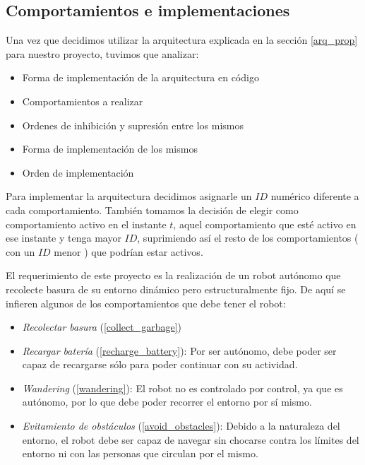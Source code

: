 
\subsection{Comportamientos e implementaciones}
\label{comportamientos}

Una vez que decidimos utilizar la arquitectura explicada en la secci\'on \ref{arq_prop}
para nuestro proyecto, tuvimos que analizar:
\begin{itemize}
\item{}Forma de implementaci\'on de la arquitectura en c\'odigo
\item{}Comportamientos a realizar
\item{}Ordenes de inhibici\'on y supresi\'on entre los mismos
\item{}Forma de implementaci\'on de los mismos
\item{}Orden de implementaci\'on
\end{itemize}

Para implementar la arquitectura decidimos asignarle un $ID$ num\'erico diferente a cada comportamiento.
Tambi\'en tomamos la decisi\'on de elegir como comportamiento activo en el instante $t$,
aquel comportamiento que est\'e activo en ese instante y tenga mayor $ID$,
suprimiendo as\'i el resto de los comportamientos ( con un $ID$ menor ) que podr\'ian estar activos.

El requerimiento de este proyecto es la realizaci\'on de un robot aut\'onomo que recolecte
basura de su entorno din\'amico pero estructuralmente fijo. De aqu\'i se infieren algunos de los
comportamientos que debe tener el robot:
\begin{itemize}
	\item{\emph{Recolectar basura} (\ref{collect_garbage})}
	\item{\emph{Recargar bater\'ia} (\ref{recharge_battery}):} Por ser aut\'onomo, debe poder 
			ser capaz de recargarse s\'olo para poder continuar con su actividad.
	\item{\emph{Wandering} (\ref{wandering}):} El robot no es controlado por control, ya que
			es aut\'onomo, por lo que debe poder recorrer el entorno por s\'i mismo.
	\item{\emph{Evitamiento de obst\'aculos} (\ref{avoid_obstacles}):} Debido a la naturaleza del
			entorno, el robot debe ser capaz de navegar sin chocarse contra los l\'imites del entorno
			ni con las personas que circulan por el mismo.
\end{itemize}

